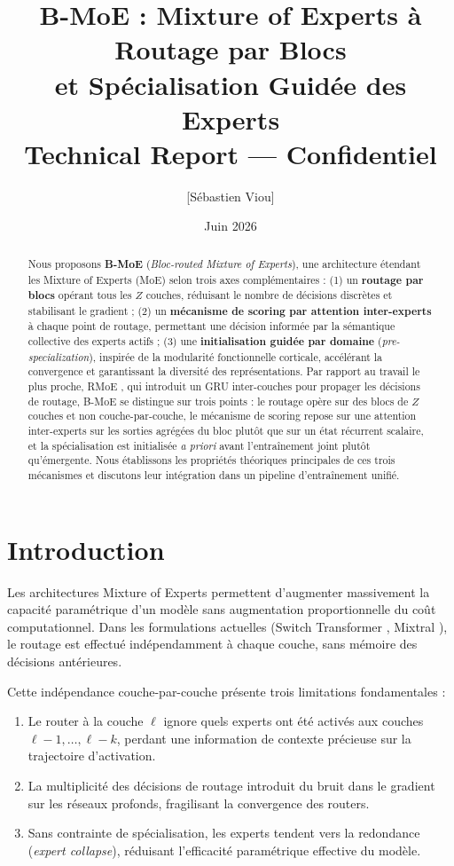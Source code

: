 \documentclass[10pt,a4paper]{article}
\title{\textbf{B-MoE : Mixture of Experts à Routage par Blocs\\
et Spécialisation Guidée des Experts}\\[0.5em]
\large Technical Report — Confidentiel}
\author{[Sébastien Viou]}
\date{Juin 2026}
\begin{document}
\maketitle

\begin{abstract}
Nous proposons \textbf{B-MoE} (\textit{Bloc-routed Mixture of Experts}), une architecture étendant les Mixture of Experts (MoE) selon trois axes complémentaires : (1) un \textbf{routage par blocs} opérant tous les $Z$ couches, réduisant le nombre de décisions discrètes et stabilisant le gradient ; (2) un \textbf{mécanisme de scoring par attention inter-experts} à chaque point de routage, permettant une décision informée par la sémantique collective des experts actifs ; (3) une \textbf{initialisation guidée par domaine} (\textit{pre-specialization}), inspirée de la modularité fonctionnelle corticale, accélérant la convergence et garantissant la diversité des représentations. Par rapport au travail le plus proche, RMoE \cite{qiu2025rmoe}, qui introduit un GRU inter-couches pour propager les décisions de routage, B-MoE se distingue sur trois points : le routage opère sur des blocs de $Z$ couches et non couche-par-couche, le mécanisme de scoring repose sur une attention inter-experts sur les sorties agrégées du bloc plutôt que sur un état récurrent scalaire, et la spécialisation est initialisée \textit{a priori} avant l'entraînement joint plutôt qu'émergente. Nous établissons les propriétés théoriques principales de ces trois mécanismes et discutons leur intégration dans un pipeline d'entraînement unifié.
\end{abstract}

\section{Introduction}

Les architectures Mixture of Experts \cite{shazeer2017outrageously} permettent d'augmenter massivement la capacité paramétrique d'un modèle sans augmentation proportionnelle du coût computationnel. Dans les formulations actuelles (Switch Transformer \cite{fedus2022switch}, Mixtral \cite{jiang2024mixtral}), le routage est effectué indépendamment à chaque couche, sans mémoire des décisions antérieures.

Cette indépendance couche-par-couche présente trois limitations fondamentales :
\begin{enumerate}
  \item Le router à la couche $\ell$ ignore quels experts ont été activés aux couches $\ell-1, \ldots, \ell-k$, perdant une information de contexte précieuse sur la trajectoire d'activation.
  \item La multiplicité des décisions de routage introduit du bruit dans le gradient sur les réseaux profonds, fragilisant la convergence des routers.
  \item Sans contrainte de spécialisation, les experts tendent vers la redondance (\textit{expert collapse}), réduisant l'efficacité paramétrique effective du modèle.
\end{enumerate}
\end{document}
